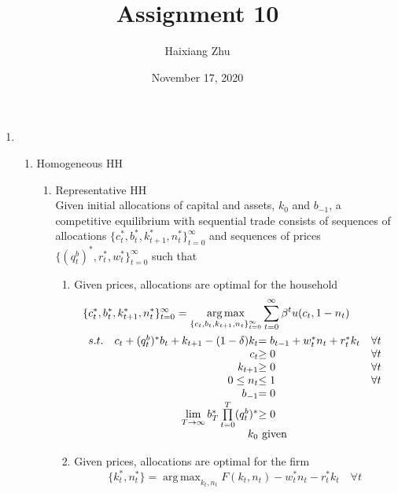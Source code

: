 \documentclass{article}
\title{Assignment 10}
\date{November 17, 2020}
\author{Haixiang Zhu}
\DeclareMathOperator*{\argmax}{arg\,max}
\begin{document}
    \maketitle
    \renewcommand{\arraystretch}{1.5}
    \begin{enumerate}
        \item 
        \begin{enumerate}
            \item Homogeneous HH
            \begin{enumerate}
                \item Representative HH\\
                Given initial allocations of capital and assets, $k_0$ and \(b_{-1}\), a competitive equilibrium with sequential trade consists of sequences of allocations $\{c_{t}^\ast,b_{t}^\ast,k_{t+1}^\ast,n_{t}^\ast\}_{t=0}^\infty$ and sequences of prices $\{(q_{t}^b)^\ast,r_{t}^\ast,w_{t}^\ast\}_{t=0}^\infty$ such that
                \begin{enumerate}[label=\arabic*)]
                    \item Given prices, allocations are optimal for the household
                    \begin{align*}
                        &\{c_{t}^\ast,b_{t}^\ast,k_{t+1}^\ast,n_{t}^\ast\}_{t=0}^\infty=\argmax_{\{c_{t},b_{t},k_{t+1},n_t\}_{t=0}^\infty}\sum_{t=0}^\infty\beta^tu(c_t,1-n_t)\\
                        &\begin{array}{r@{\quad}r@{}l@{\quad}l}
                        s.t.&c_{t}+(q_{t}^b)^\ast b_t+k_{t+1}-(1-\delta)k_t&= b_{t-1}+w_{t}^\ast n_t+r_t^\ast k_t&\forall t\\
                        &c_{t}&\ge0 &\forall t\\
                        &k_{t+1}&\ge0 &\forall t\\
                        &0\le n_{t}&\le1 &\forall t\\
                        &b_{-1}&=0\\
                        &\lim\limits_{T\to\infty}b_{T}^\ast\prod\limits_{t=0}^T(q_{t}^b)^\ast&\ge0\\
                        &k_0&\text{ given}
                        \end{array} 
                    \end{align*}
                    \item Given prices, allocations are optimal for the firm
                    \[\{k_{t}^\ast,n_{t}^\ast\}=\argmax_{k_t,n_t}F(k_t,n_t)-w_{t}^\ast n_t-r_t^\ast k_t\quad\forall t\]

\end{enumerate}
\end{enumerate}
\end{enumerate}
\end{enumerate}
\end{document}
